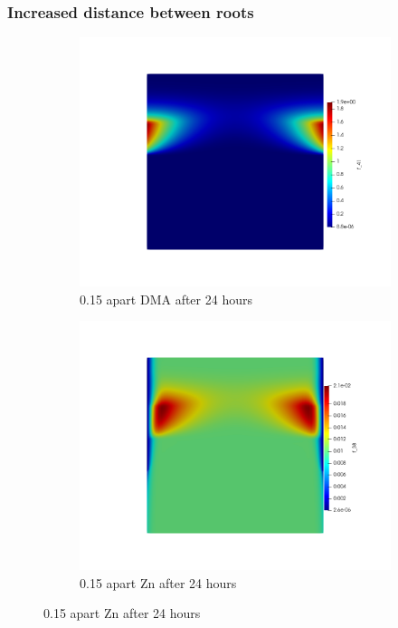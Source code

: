 \documentclass[11pt]{article}
\numberwithin{equation}{section}
\begin{document}
\subsubsection{Increased distance between roots}
 \begin{figure}
     \centering
     \caption{Increased distance}
     \begin{subfigure}[t]{0.45\textwidth}
     \includegraphics[width=\textwidth]{Figures/testpics/0.15ApartDMA24.png}
     \caption{0.15 apart DMA after 24 hours}
     \end{subfigure}
     \begin{subfigure}[t]{0.45\textwidth}
     \includegraphics[width=\textwidth]{Figures/testpics/0.15ApartZn24.png}
     \caption{0.15 apart Zn after 24 hours}
     \end{subfigure}
 \end{figure}
\FloatBarrier
\end{document}
